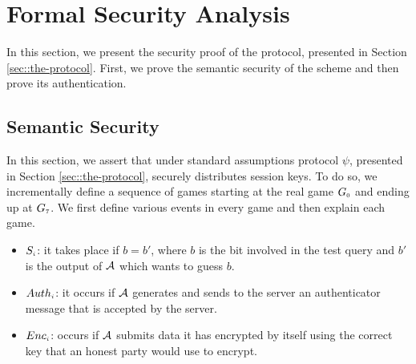 
\section{Formal Security Analysis}\label{sec::Formal-Security-Analysis}

In this section, we present the security proof of the protocol, presented in Section \ref{sec::the-protocol}.  First, we prove the semantic security of the scheme and then prove its authentication. 

\subsection{Semantic Security}\label{sec::semSec-proof}

In this section, we assert that under standard assumptions protocol $\psi$, presented in Section \ref{sec::the-protocol}, securely distributes
session keys. To do so, we incrementally define a sequence of games starting at the real
game $G_{\scriptscriptstyle 0}$ and ending up at $G_{\scriptscriptstyle  7}$. We first define various events in every game and then explain each game. 

\begin{itemize}
%
\item  $S_{\scriptscriptstyle  i}$: it takes place if $b=b'$, where $b$ is the bit involved in the test query and $b'$ is the output of $\mathcal{A}$ which wants to guess $b$. 
%
\item $Auth_{\scriptscriptstyle  i}$: it occurs if $\mathcal{A}$ generates and sends to the server an authenticator message that is accepted by the server.
%
\item $Enc_{\scriptscriptstyle  i}$: occurs if $\mathcal{A}$ submits data it has encrypted by itself using the correct key that an honest party would use to encrypt. 
%
\end{itemize}

